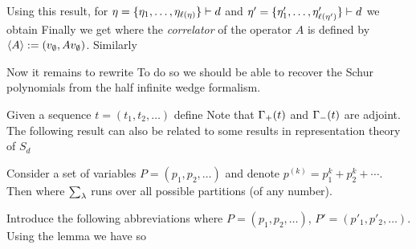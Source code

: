 \documentclass[../main/main.tex]{subfiles}
\begin{document}
Using this result, for $\eta=\{\eta_1,\ldots,\eta_{\ell(\eta)}\}\vdash d$ and $\eta'=\{\eta'_1,\ldots,\eta'_{\ell(\eta')}\}\vdash d$ we obtain
Finally we get
where the \emph{correlator} of the operator $A$ is defined by $\langle A\rangle:=(v_\emptyset,Av_\emptyset)$. Similarly


Now it remains to rewrite
To do so we should be able to recover the Schur polynomials from the half infinite wedge formalism. 

Given a sequence $t=(t_1,t_2,\ldots)$ define
Note that $\Gamma_+(t)$ and $\Gamma_-(t)$ are adjoint. The following result can also be related to some results in representation theory of $S_d$
\begin{lemma}
	Consider a set of variables $P=(p_1,p_2,\ldots)$ and denote $p^{(k)}=p_1^k+p_2^k+\cdots$. Then
	where $\sum_\lambda$ runs over all possible partitions (of any number).
\end{lemma}
Introduce the following abbreviations
where $P=(p_1,p_2,\ldots)$, $P'=(p'_1,p'_2,\ldots)$. 
Using the lemma we have
so
\end{document}
